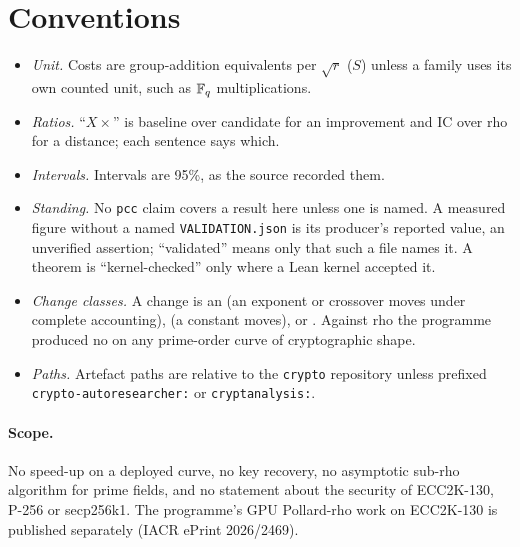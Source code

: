 \section*{Conventions}

\begin{itemize}
\item \emph{Unit.} Costs are group-addition equivalents per $\sqrt r$
  ($S$) unless a family uses its own counted unit, such as $\mathbb{F}_q$
  multiplications.
\item \emph{Ratios.} ``$X\times$'' is baseline over candidate for an
  improvement and IC over rho for a distance; each sentence says which.
\item \emph{Intervals.} Intervals are 95\%, as the source recorded them.
\item \emph{Standing.} No \texttt{pcc} claim covers a result here unless
  one is named. A measured figure without a named \texttt{VALIDATION.json}
  is its producer's reported value, an unverified assertion; ``validated''
  means only that such a file names it. A theorem is ``kernel-checked''
  only where a Lean kernel accepted it.
\item \emph{Change classes.} A change is an  (an exponent or
  crossover moves under complete accounting),  (a constant
  moves),  or . Against rho the programme
  produced no  on any prime-order curve of cryptographic
  shape.
\item \emph{Paths.} Artefact paths are relative to the \texttt{crypto}
  repository unless prefixed \texttt{crypto-autoresearcher:} or
  \texttt{cryptanalysis:}.
\end{itemize}

\paragraph{Scope.} No speed-up on a deployed curve, no key recovery, no
asymptotic sub-rho algorithm for prime fields, and no statement about the
security of ECC2K-130, P-256 or secp256k1. The programme's GPU Pollard-rho
work on ECC2K-130 is published separately (IACR ePrint 2026/2469).
